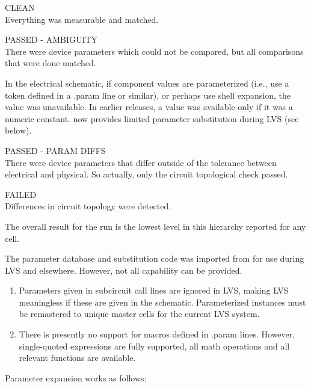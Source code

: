 \begin{description}
\item{CLEAN}\\
Everything was measurable and matched.

\item{PASSED - AMBIGUITY}\\
There were device parameters which could not be compared, but all
comparisons that were done matched.

In the electrical schematic, if component values are
parameterized (i.e., use a token defined in a {\vt .param}
line or similar), or perhaps use {\WRspice} shell
expansion, the value was unavailable.  In earlier releases, a
value was available only if it was a numeric constant.
{\Xic} now provides limited parameter substitution during
LVS (see below).

\item{PASSED - PARAM DIFFS}\\
There were device parameters that differ outside of the
tolerance between electrical and physical.  So actually, only
the circuit topological check passed.

\item{FAILED}\\
Differences in circuit topology were detected.
\end{description}

The overall result for the run is the lowest level in this hierarchy
reported for any cell.

The parameter database and substitution code was imported from
{\WRspice} for use during LVS and elsewhere.  However, not all
capability can be provided.

\begin{enumerate}
\item{Parameters given in subcircuit call lines are ignored in LVS,
making LVS meaningless if these are given in the schematic.
Parameterized instances must be remastered to unique master cells
for the current LVS system.}

\item{There is presently no support for macros defined in
{\vt .param} lines.  However, single-quoted expressions are
fully supported, all math operations and all relevant functions
are available.}
\end{enumerate}

Parameter expansion works as follows:

